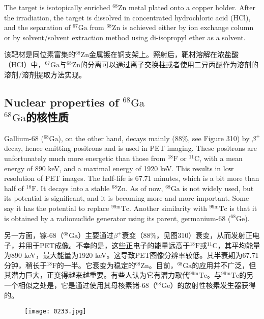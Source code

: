 \documentclass[dvipsnames, svgnames,a4paper,11pt]{article}
\begin{document}
The target is isotopically enriched \(\mathrm{^{68}Zn}\) metal plated onto a copper holder. After the irradiation, the target is dissolved in concentrated hydrochloric acid (HCl), and the separation of \(\mathrm{^{67}Ga}\) from \(\mathrm{^{68}Zn}\) is achieved either by ion exchange column or by solvent/solvent extraction method using di-isopropyl ether as a solvent.

该靶材是同位素富集的\(\mathrm{^{68}Zn}\)金属镀在铜支架上。照射后，靶材溶解在浓盐酸（HCl）中，\(\mathrm{^{67}Ga}\)与\(\mathrm{^{68}Zn}\)的分离可以通过离子交换柱或者使用二异丙醚作为溶剂的溶剂/溶剂提取方法实现。

\subsection{Nuclear properties of \(\mathrm{^{68}Ga}\)\\ \(\mathrm{^{68}Ga}\)的核性质}  
Gallium-68 (\(\mathrm{^{68}Ga}\)), on the other hand, decays mainly (88\%, see Figure 310) by \(\beta^{+}\) decay, hence emitting positrons and is used in PET imaging. These positrons are unfortunately much more energetic than those from \(\mathrm{^{18}F}\) or \(\mathrm{^{11}C}\), with a mean energy of 890 keV, and a maximal energy of 1920 keV. This results in low resolution of PET images. The half-life is 67.71 minutes, which is a bit more than half of \(\mathrm{^{18}F}\). It decays into a stable \(\mathrm{^{68}Zn}\). As of now, \(\mathrm{^{68}Ga}\) is not widely used, but its potential is significant, and it is becoming more and more important. Some say it has the potential to replace \(\mathrm{^{99m}Tc}\). Another similarity with \(\mathrm{^{99m}Tc}\) is that it is obtained by a radionuclide generator using its parent, germanium-68 (\(\mathrm{^{68}Ge}\)).

另一方面，镓-68（\(\mathrm{^{68}Ga}\)）主要通过\(\beta^{+}\)衰变（88\%，见图310）衰变，从而发射正电子，并用于PET成像。不幸的是，这些正电子的能量远高于\(\mathrm{^{18}F}\)或\(\mathrm{^{11}C}\)，其平均能量为890 keV，最大能量为1920 keV。这导致PET图像分辨率较低。其半衰期为67.71分钟，稍长于\(\mathrm{^{18}F}\)的一半。它衰变为稳定的\(\mathrm{^{68}Zn}\)。目前，\(\mathrm{^{68}Ga}\)的应用并不广泛，但其潜力巨大，正变得越来越重要。有些人认为它有潜力取代\(\mathrm{^{99m}Tc}\)。与\(\mathrm{^{99m}Tc}\)的另一个相似之处是，它是通过使用其母核素锗-68（\(\mathrm{^{68}Ge}\)）的放射性核素发生器获得的。

\begin{figure}[h]
	\centering
    \texttt{[image: 0233.jpg]}  
     \label{fig310}
\end{figure}
\end{document}
